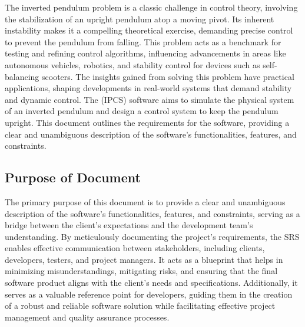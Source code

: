 \documentclass[12pt]{article}
\begin{document}
The inverted pendulum problem is a classic challenge in control theory,
involving the stabilization of an upright pendulum atop a moving pivot.
Its inherent instability makes it a compelling theoretical exercise,
demanding precise control to prevent the pendulum from falling.
This problem acts as a benchmark for testing and refining control algorithms,
influencing advancements in areas like autonomous vehicles, robotics,
and stability control for devices such as self-balancing scooters.
The insights gained from solving this problem have practical applications,
shaping developments in real-world systems that demand stability
and dynamic control. The \progname{} (IPCS) software aims to simulate the physical
system of an inverted pendulum and design a control system to keep the pendulum
upright. This document outlines the requirements for the \progname{} software,
providing a clear and unambiguous description of the software's functionalities,
features, and constraints.


\subsection{Purpose of Document}


The primary purpose of this document is to provide a clear and unambiguous
description of the software's functionalities, features, and constraints,
serving as a bridge between the client's expectations and 
the development team's understanding. By meticulously documenting 
the project's requirements, the SRS enables effective communication 
between stakeholders, including clients, developers, testers, 
and project managers. It acts as a blueprint that helps 
in minimizing misunderstandings, mitigating risks, and ensuring 
that the final software product aligns with the client's needs 
and specifications. Additionally, it serves as a valuable 
reference point for developers, guiding them in the creation 
of a robust and reliable software solution while facilitating 
effective project management and quality assurance processes.
\end{document}
